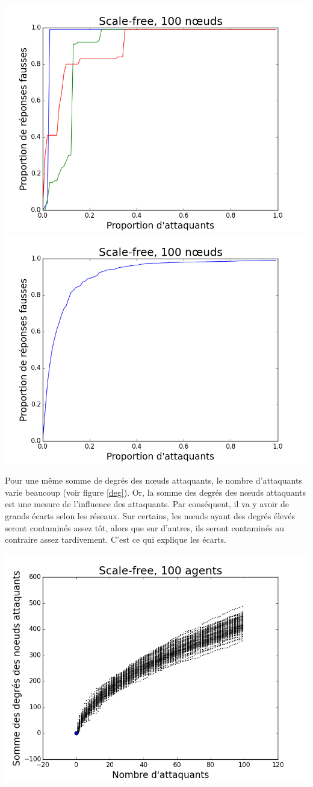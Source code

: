 \documentclass[12pt,a4paper]{article}
\begin{document}
\begin{center}
\includegraphics[width=0.49\linewidth]{../resultats/scale-free/sf-t1s-n100-2-it3.png}
\includegraphics[width=0.49\linewidth]{../resultats/scale-free/sf-t1-n100-1-it100.png}
 \label{sf}
\end{center}

Pour une même somme de degrés des nœuds attaquants, le nombre d'attaquants varie beaucoup (voir figure \ref{deg}).
Or, la somme des degrés des nœuds attaquants est une mesure de l'influence des attaquants.
Par conséquent, il va y avoir de grands écarts selon les réseaux.
Sur certains, les nœuds ayant des degrés élevés seront contaminés assez tôt, alors que sur d'autres, ils seront contaminés au contraire assez tardivement.
C'est ce qui explique les écarts.

\begin{center}
\includegraphics[width=0.49\linewidth]{../resultats/scale-free/sf-t2-n-100-1-it100.png}
 \label{deg}
\end{center}
\end{document}
